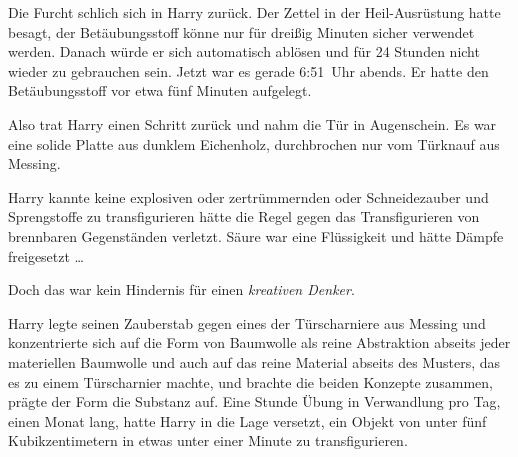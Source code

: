 Die Furcht schlich sich in Harry zurück. Der Zettel in der Heil-Ausrüstung hatte besagt, der Betäubungsstoff könne nur für dreißig Minuten sicher verwendet werden. Danach würde er sich automatisch ablösen und für 24 Stunden nicht wieder zu gebrauchen sein. Jetzt war es gerade 6:51~Uhr abends. Er hatte den Betäubungsstoff vor etwa fünf Minuten aufgelegt.

Also trat Harry einen Schritt zurück und nahm die Tür in Augenschein. Es war eine solide Platte aus dunklem Eichenholz, durchbrochen nur vom Türknauf aus Messing.

Harry kannte keine explosiven oder zertrümmernden oder Schneidezauber und Sprengstoffe zu transfigurieren hätte die Regel gegen das Transfigurieren von brennbaren Gegenständen verletzt. Säure war eine Flüssigkeit und hätte Dämpfe freigesetzt …

Doch das war kein Hindernis für einen \emph{kreativen Denker}.

Harry legte seinen Zauberstab gegen eines der Türscharniere aus Messing und konzentrierte sich auf die Form von Baumwolle als reine Abstraktion abseits jeder materiellen Baumwolle und auch auf das reine Material abseits des Musters, das es zu einem Türscharnier machte, und brachte die beiden Konzepte zusammen, prägte der Form die Substanz auf. Eine Stunde Übung in Verwandlung pro Tag, einen Monat lang, hatte Harry in die Lage versetzt, ein Objekt von unter fünf Kubikzentimetern in etwas unter einer Minute zu transfigurieren.

